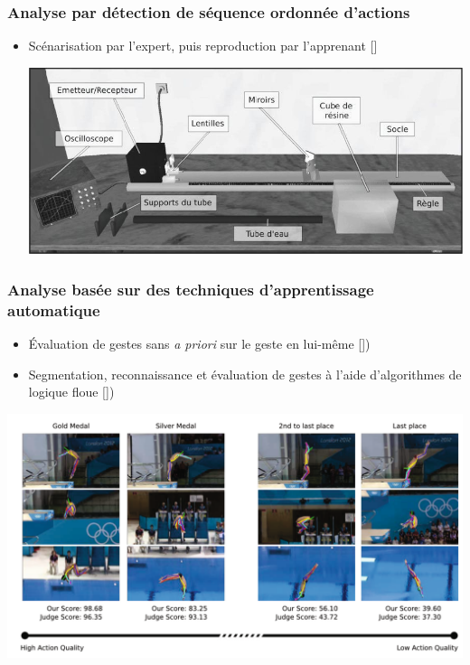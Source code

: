 \documentclass[svgnames]{beamer}
\newcommand{\mycite}[1]{[\textit{\cite{#1}}]}
\begin{document}
	\subsubsection{Analyse par détection de séquence ordonnée d'actions}
	\begin{frame}{\subsubsecname}
		\begin{itemize}[label=$\bullet$]
			\item Scénarisation par l'expert, puis reproduction par l'apprenant \mycite{Baudouin2007, Mahdi2019TaE}	
			
			\vspace{1cm}
			
			\centering
				\includegraphics[scale=0.4]{img/eiah_baudouin.png}
		\end{itemize}
	\end{frame}
	
	\subsubsection{Analyse basée sur des techniques d'apprentissage automatique}
	\begin{frame}{\subsubsecname}
		\begin{itemize}[label=$\bullet$]
			\item Évaluation de gestes sans \textit{a priori} sur le geste en lui-même \mycite{Pirsiavash2014AQA})
			\item Segmentation, reconnaissance et évaluation de gestes à l'aide d'algorithmes de logique floue \mycite{Patrona2018MaA})
		\end{itemize}
		
		\centering
		\includegraphics[scale=0.3]{img/olympic_games.png}
	\end{frame}
	
\end{document}
